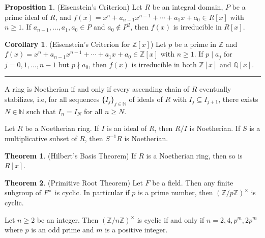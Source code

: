 \documentclass[12pt]{article}
\newcommand{\sepline}{\rule{\textwidth}{0.4pt}}
\theoremstyle{definition}
\newtheorem{theorem}{Theorem}
\newtheorem{corollary}{Corollary}
\newtheorem{proposition}{Proposition}
\newcommand{\N}{\mathbb{N}}
\newcommand{\Z}{\mathbb{Z}}
\newcommand{\Q}{\mathbb{Q}}
\newcommand{\<}{\left\langle}
\renewcommand{\>}{\right\rangle}
\newcommand{\seq}{\subseteq}
\newcommand{\divides}{\mid}
\newcommand{\ndivides}{\nmid}
\begin{document}
\begin{proposition}(Eisenstein's Criterion)
    Let $R$ be an integral domain, $P$ be a prime ideal of $R$, and $f(x) = x^n + a_{n-1}x^{n-1} + \cdots + a_1 x + a_0 \in R[x]$ with $n \geq 1$. If $a_{n-1}, \dots, a_1, a_0 \in P$ and $a_0 \notin P^2$, then $f(x)$ is irreducible in $R[x]$.
\end{proposition}

\begin{corollary}(Eisenstein's Criterion for $\Z[x]$)
    Let $p$ be a prime in $\Z$ and $f(x) = x^n + a_{n-1}x^{n-1} + \cdots + a_1 x + a_0 \in \Z[x]$ with $n \geq 1$. If $p \divides a_j$ for $j = 0, 1, \dots, n-1$ but $p \ndivides a_0$, then $f(x)$ is irreducible in both $\Z[x]$ and $\Q[x]$.
\end{corollary}

\sepline

A ring is Noetherian if and only if every ascending chain of $R$ eventually stabilizes, i.e, for all sequences $\{I_j\}_{j\in\N}$ of ideals of $R$ with $I_j \seq I_{j+1}$, there exists $N \in \N$ such that $I_n = I_N$ for all $n \geq N$.

Let $R$ be a Noetherian ring. If $I$ is an ideal of $R$, then $R/I$ is Noetherian. If $S$ is a multiplicative subset of $R$, then $S^{-1}R$ is Noetherian.

\begin{theorem}(Hilbert's Basis Theorem)
    If $R$ is a Noetherian ring, then so is $R[x]$.
\end{theorem}

\begin{theorem}(Primitive Root Theorem)
    Let $F$ be a field. Then any finite subgroup of $F^\times$ is cyclic. In particular if $p$ is a prime number, then $(\Z/p\Z)^\times$ is cyclic.
\end{theorem}

Let $n \geq 2$ be an integer. Then $(\Z/n\Z)^\times$ is cyclic if and only if $n = 2, 4, p^m, 2p^m$ where $p$ is an odd prime and $m$ is a positive integer.
\end{document}
